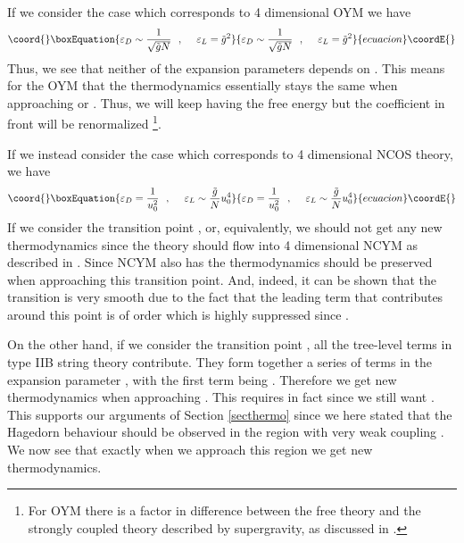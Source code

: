 \documentclass[a4paper,twoside,titlepage,12pt]{article}
\begin{document}
If we consider the case \coordHE{} which corresponds to
4 dimensional OYM we have 
%
\begin{equation}\coord{}\boxEquation{
\varepsilon_D \sim \frac{1}{\sqrt{\tilde{g}N}} \spa
\varepsilon_L = \tilde{g}^2
}{
\varepsilon_D \sim \frac{1}{\sqrt{\tilde{g}N}} \spa
\varepsilon_L = \tilde{g}^2
}{ecuacion}\coordE{}\end{equation}
%
Thus, we see that neither of the expansion parameters depends on
\coordHE{}. This means for the OYM that the thermodynamics essentially
stays the same when approaching \coordHE{} or
\coordHE{}. Thus, we will keep having 
the free energy \coordHE{} but the coefficient in front
will be renormalized%
\footnote{For OYM there is a factor \coordHE{}
in difference between the free theory and the strongly coupled theory
described by supergravity, as discussed in \cite{Gubser:1998nz}.}.

If we instead consider the case \coordHE{} which corresponds
to 4 dimensional NCOS theory, we have
%
\begin{equation}\coord{}\boxEquation{
\varepsilon_D = \frac{1}{u_0^2} \spa
\varepsilon_L \sim \frac{\tilde{g}}{N} u_0^4 
}{
\varepsilon_D = \frac{1}{u_0^2} \spa
\varepsilon_L \sim \frac{\tilde{g}}{N} u_0^4 
}{ecuacion}\coordE{}\end{equation}
%
If we consider the transition point \coordHE{},
or, equivalently, \coordHE{} we should not
get any new thermodynamics since the theory should flow into
4 dimensional NCYM as described in \cite{Ganor:2000my,Gopakumar:2000na}. 
Since NCYM also has
\coordHE{} the thermodynamics should be preserved when
approaching this transition point. And, indeed, it can be shown 
\cite{Correia:2000} that the \coordHE{} transition
is very smooth due to the fact that the leading term that
contributes around this point is of order 
\coordHE{} which is highly suppressed since
\coordHE{}.

On the other hand, if we consider the transition point 
\coordHE{}, all the tree-level terms in type IIB string theory
contribute. They form together a series of terms in the expansion
parameter \coordHE{}, with the first term being
\coordHE{}.
Therefore we get new thermodynamics when approaching \coordHE{}.
This requires in fact \coordHE{} since we still want
\coordHE{}. 
This supports our arguments of Section \ref{secthermo} since we here
stated that the Hagedorn behaviour should be observed in the region
\coordHE{} with very weak coupling \coordHE{}.
We now see that exactly when we approach this region we get
new thermodynamics.
\end{document}

